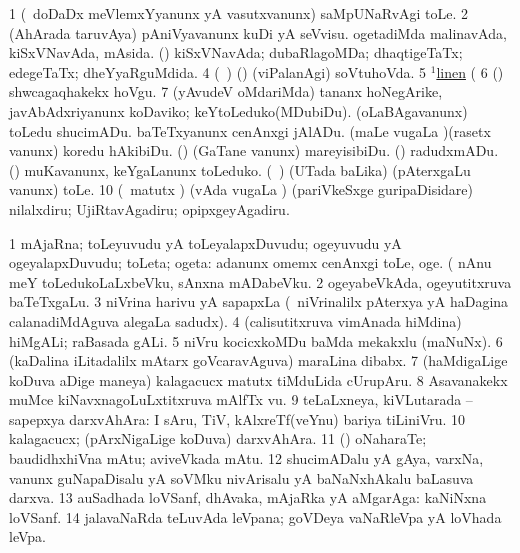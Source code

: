 \noindent 
\gl{\pagu}
\expl{}
\bmng
\bnum
\num{1}  (\kanmu\ doDaDx meVlemxYyanunx yA vasutxvanunx) saMpUNaRvAgi toLe. 
\num{2}  (AhArada taruvAya) pAniVyavanunx kuDi yA seVvisu. 
  
\banum
{} ogetadiMda malinavAda, kiSxVNavAda, mAsida. 
 (\rUpa) kiSxVNavAda; dubaRlagoMDa; dhaqtigeTaTx; edegeTaTx; dheYyaRguMdida. 
\eanum
\numie
\num{4}  (\kanmu\ \ame) (\ashi) (viPalanAgi) soVtuhoVda. 
\num{5}  \hyperref{kandict_l.pdf}{L}{linen(1) nuga(1)}{$^1$linen}  (  
\num{6}  (\sw) shwcagaqhakekx hoVgu. 
\num{7}  (yAvudeV oMdariMda) tananx hoNegArike, javAbAdxriyanunx koDaviko; keYtoLeduko(MDubiDu). 
  
\banum
{} (oLaBAgavanunx) toLedu shucimADu. 
 baTeTxyanunx cenAnxgi jAlADu. 
 (maLe \mo vugaLa \vi)(rasetx \mo vanunx) koredu hAkibiDu. 
 (\rUpa) (GaTane \mo vanunx) mareyisibiDu. 
 (\AmA) radudxmADu. 
\eanum
\numie
{}  
\banum
{} (\ame) muKavanunx, keYgaLanunx toLeduko. 
 (\kanmu\ \birx) (UTada baLika) (pAterxgaLu \mo vanunx) toLe. 
\eanum
\numie
\num{10}  (\AmA\ matutx \rUpa) (vAda \mo vugaLa \vi) (pariVkeSxge guripaDisidare) nilalxdiru; UjiRtavAgadiru; opipxgeyAgadiru. 
\enum
\emng
\eentry

\bentry
{} 
\gl{\nA}
\expl{}
\bmng
\bnum
\num{1} mAjaRna; toLeyuvudu yA toLeyalapxDuvudu; ogeyuvudu yA ogeyalapxDuvudu; toLeta; ogeta:  adanunx omemx cenAnxgi toLe, oge.  (  nAnu meY toLedukoLaLxbeVku, sAnxna mADabeVku. 
\num{2} ogeyabeVkAda, ogeyutitxruva baTeTxgaLu. 
\num{3} niVrina harivu yA sapapxLa (\kanmu\ niVrinalilx pAterxya yA haDagina calanadiMdAguva alegaLa sadudx). 
\num{4} (calisutitxruva vimAnada hiMdina) hiMgALi; raBasada gALi. 
\num{5} niVru kocicxkoMDu baMda mekakxlu (maNuNx). 
\num{6} (kaDalina iLitadalilx mAtarx goVcaravAguva) maraLina dibabx. 
\num{7} (haMdigaLige koDuva aDige maneya) kalagacucx matutx tiMduLida cUrupAru. 
\num{8} Asavanakekx muMce kiNavxnagoLuLxtitxruva mAlfTx \mo vu. 
\num{9} teLaLxneya, kiVLutarada -- sapepxya darxvAhAra:  I sAru, TiV, kAlxreTf(veYnu) bariya tiLiniVru. 
\num{10} kalagacucx; (pArxNigaLige koDuva) darxvAhAra. 
\num{11} (\rUpa) oNaharaTe; baudidhxhiVna mAtu; aviveVkada mAtu. 
\num{12} shucimADalu yA gAya, varxNa, \mo vanunx guNapaDisalu yA soVMku nivArisalu yA baNaNxhAkalu baLasuva darxva. 
\num{13} auSadhada loVSanf, dhAvaka, mAjaRka yA aMgarAga:  kaNiNxna loVSanf. 
\num{14} jalavaNaRda teLuvAda leVpana; goVDeya vaNaRleVpa yA loVhada leVpa. 
\enum
\emng

